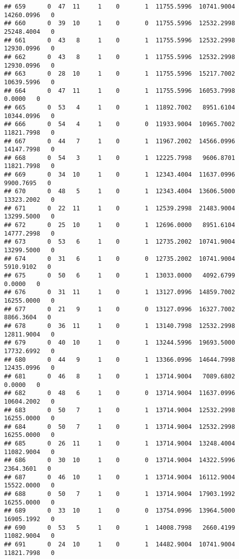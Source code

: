 \documentclass[
]{article}
\begin{document}
\begin{enumerate}
\begin{verbatim}
## 659      0  47  11     1    0       1  11755.5996  10741.9004  14260.0996   0
## 660      0  39  10     1    0       0  11755.5996  12532.2998  25248.4004   0
## 661      0  43   8     1    0       1  11755.5996  12532.2998  12930.0996   0
## 662      0  43   8     1    0       1  11755.5996  12532.2998  12930.0996   0
## 663      0  28  10     1    0       1  11755.5996  15217.7002  10639.5996   0
## 664      0  47  11     1    0       1  11755.5996  16053.7998      0.0000   0
## 665      0  53   4     1    0       1  11892.7002   8951.6104  10344.0996   0
## 666      0  54   4     1    0       0  11933.9004  10965.7002  11821.7998   0
## 667      0  44   7     1    0       1  11967.2002  14566.0996  14147.7998   0
## 668      0  54   3     1    0       1  12225.7998   9606.8701  11821.7998   0
## 669      0  34  10     1    0       1  12343.4004  11637.0996   9900.7695   0
## 670      0  48   5     1    0       1  12343.4004  13606.5000  13323.2002   0
## 671      0  22  11     1    0       1  12539.2998  21483.9004  13299.5000   0
## 672      0  25  10     1    0       1  12696.0000   8951.6104  14777.2998   0
## 673      0  53   6     1    0       1  12735.2002  10741.9004  13299.5000   0
## 674      0  31   6     1    0       0  12735.2002  10741.9004   5910.9102   0
## 675      0  50   6     1    0       1  13033.0000   4092.6799      0.0000   0
## 676      0  31  11     1    0       1  13127.0996  14859.7002  16255.0000   0
## 677      0  21   9     1    0       0  13127.0996  16327.7002   8866.3604   0
## 678      0  36  11     1    0       1  13140.7998  12532.2998  12811.9004   0
## 679      0  40  10     1    0       1  13244.5996  19693.5000  17732.6992   0
## 680      0  44   9     1    0       1  13366.0996  14644.7998  12435.0996   0
## 681      0  46   8     1    0       1  13714.9004   7089.6802      0.0000   0
## 682      0  48   6     1    0       0  13714.9004  11637.0996  10604.2002   0
## 683      0  50   7     1    0       1  13714.9004  12532.2998  16255.0000   0
## 684      0  50   7     1    0       1  13714.9004  12532.2998  16255.0000   0
## 685      0  26  11     1    0       1  13714.9004  13248.4004  11082.9004   0
## 686      0  30  10     1    0       0  13714.9004  14322.5996   2364.3601   0
## 687      0  46  10     1    0       1  13714.9004  16112.9004  15522.0000   0
## 688      0  50   7     1    0       1  13714.9004  17903.1992  16255.0000   0
## 689      0  33  10     1    0       0  13754.0996  13964.5000  16905.1992   0
## 690      0  53   5     1    0       1  14008.7998   2660.4199  11082.9004   0
## 691      0  24  10     1    0       1  14482.9004  10741.9004  11821.7998   0

\end{verbatim}
\end{enumerate}
\end{document}
